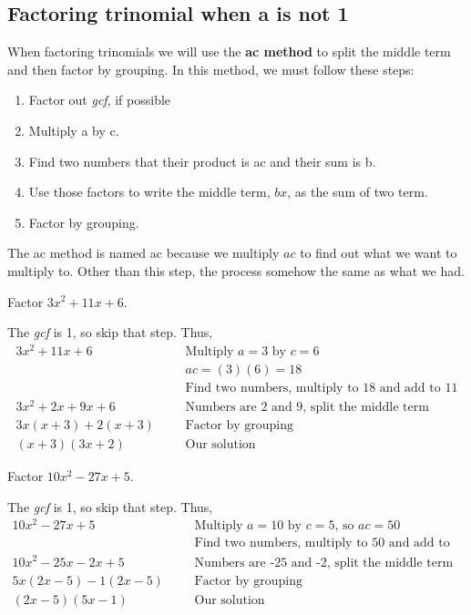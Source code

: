\subsection{Factoring trinomial when a is not 1}
When factoring trinomials we will use the \textbf{ac method} to split the middle term and then factor by grouping. In  this method, we must follow these steps:
\begin{tcolorbox}[title={Factoring Trinomial when $a\neq1$},
colback=blue!5!white,
colframe=blue!75!black,
fonttitle=\bfseries]
\begin{enumerate}[1]
    \item Factor out \textit{gcf}, if possible
    \item Multiply a by c.
    \item Find two numbers that their product is ac and their sum is b.
    \item Use those factors to write the middle term, $bx$, as the sum of two term.
    \item Factor by grouping.
\end{enumerate}
\end{tcolorbox}
The ac method is named ac because we multiply $ac$ to find out what we want to multiply to. Other than this step, the process somehow the same as what we had.
\begin{exa}
    Factor $3x^2+11x+6$.
\end{exa}
The \textit{gcf} is 1, so skip that step. Thus,
\begin{align*}
    3x^2+11x+6& &   &\text{Multiply $a=3$ by $c=6$}\\
    &&&ac=(3)(6)=18\\
    &&&\text{Find two numbers, multiply to 18 and add to 11}\\
    3x^2+2x+9x+6&   &&\text{Numbers are 2 and 9, split the middle term}\\
    3x(x+3)+2(x+3)& &&\text{Factor by grouping}\\
    (x+3)(3x+2)&    &&\text{Our solution}
\end{align*}
\vspace{0.2cm}
\begin{exa}
    Factor $10x^2-27x+5$.
\end{exa}
The \textit{gcf} is 1, so skip that step. Thus,
\begin{align*}
    10x^2-27x+5& &   &\text{Multiply $a=10$ by $c=5$, so $ac=50$}\\
    &&&\text{Find two numbers, multiply to 50 and add to -27}\\
    10x^2-25x-2x+5&   &&\text{Numbers are -25 and -2, split the middle term}\\
    5x(2x-5)-1(2x-5)& &&\text{Factor by grouping}\\
    (2x-5)(5x-1)&    &&\text{Our solution}
\end{align*}
